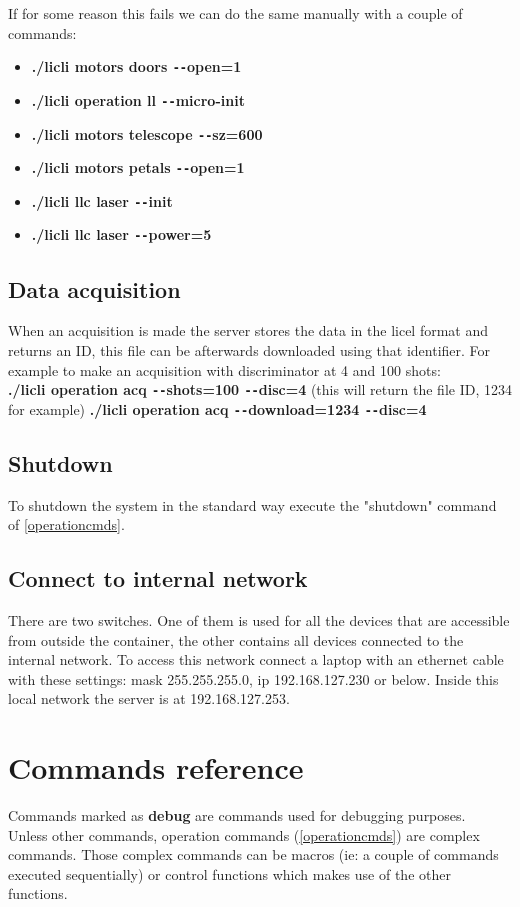 \documentclass[letterpaper, 10 pt]{article}
\begin{document}
If for some reason this fails we can do the same manually with a couple of commands:
\begin{itemize}
	\item \textbf{./licli motors doors \texttt{-{}-}open=1}
	\item \textbf{./licli operation ll  \texttt{-{}-}micro-init}
	\item \textbf{./licli motors telescope \texttt{-{}-}sz=600}
	\item \textbf{./licli motors petals \texttt{-{}-}open=1}
	\item \textbf{./licli llc laser \texttt{-{}-}init}
	\item  \textbf{./licli llc laser \texttt{-{}-}power=5}
\end{itemize}
\subsection{Data acquisition}
When an acquisition is made the server stores the data in the licel format and returns an ID, this file can be afterwards downloaded using that identifier. For example to make an acquisition with discriminator at 4 and 100 shots:\\
\textbf{./licli operation acq \texttt{-{}-}shots=100 \texttt{-{}-}disc=4}  (this will return the file ID, 1234 for example)
\textbf{./licli operation acq \texttt{-{}-}download=1234 \texttt{-{}-}disc=4}
\subsection{Shutdown}
To shutdown the system in the standard way execute the "shutdown" command of \ref{operationcmds}.\\

\subsection{Connect to internal network}
There are two switches. One of them is used for all the devices that are accessible from outside the container, the other contains all devices connected to the internal network. To access this network connect a laptop with an ethernet cable with these settings: mask 255.255.255.0, ip 192.168.127.230 or below. Inside this local network the server is at 192.168.127.253.

\section{Commands reference}
Commands marked as \textbf{debug} are commands used for debugging purposes.\\
\linebreak
Unless other commands, operation commands (\ref{operationcmds}) are complex commands. Those complex commands can be macros (ie: a couple of commands executed sequentially) or control functions which makes use of the other functions.
\end{document}
